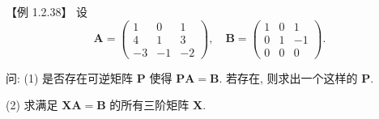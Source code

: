 \documentclass[../../main.tex]{subfiles}
\begin{document}
\begin{example}
【例 1.2.38】 设
\[
\boldsymbol{A} = \begin{pmatrix} 
1 & 0 & 1 \\
4 & 1 & 3 \\
-3 & -1 & -2 
\end{pmatrix}, \quad \boldsymbol{B} = \begin{pmatrix} 
1 & 0 & 1 \\
0 & 1 & -1 \\
0 & 0 & 0 
\end{pmatrix}.
\]

问: (1) 是否存在可逆矩阵 $\boldsymbol{P}$ 使得 $\boldsymbol{PA} = \boldsymbol{B}$. 若存在, 则求出一个这样的 $\boldsymbol{P}$.

(2) 求满足 $\boldsymbol{XA} = \boldsymbol{B}$ 的所有三阶矩阵 $\boldsymbol{X}$.
\end{example}
\end{document}
